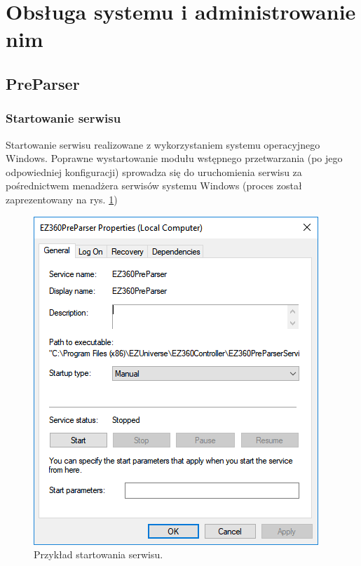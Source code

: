 \documentclass[a4paper]{book}
\begin{document}
\section{Obsługa systemu i administrowanie nim}
\subsection{PreParser}
\subsubsection{Startowanie serwisu}
Startowanie serwisu realizowane z wykorzystaniem systemu operacyjnego Windows. Poprawne wystartowanie modułu wstępnego przetwarzania (po jego odpowiedniej konfiguracji) sprowadza się do uruchomienia serwisu za pośrednictwem menadżera serwisów systemu Windows (proces został zaprezentowany na rys. \ref{fig:startowanie_serwisu})
\begin{figure}[h]
	\centering
	\includegraphics[width=\textwidth]{./img/startowanie_serwisu.png}
	\caption{Przykład startowania serwisu.}
	\label{fig:startowanie_serwisu}
\end{figure}
\end{document}
